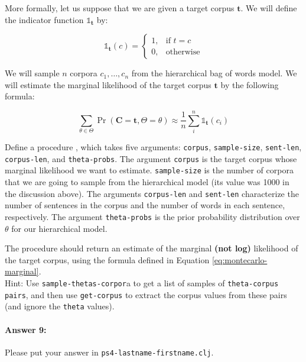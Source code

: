 \documentclass[10pt]{article}
\newcommand{\required}[1]{{\color{blue}{#1}}}
\newcommand{\PSnum}{4}
\begin{document}
More formally, let us suppose that we are given a target
corpus $\mathbf{t}$. We will define the indicator function
$\mathds{1}_{\mathbf{t}}$ by:

\begin{equation}
\mathds{1}_{\mathbf{t}}(c) =
\begin{cases}
    1, & \text{if } t = c\\
    0, & \text{otherwise}
\end{cases}
\end{equation}

 We will sample $n$ corpora $c_1,\ldots,c_n$ from the
hierarchical bag of words model. We will estimate the marginal
likelihood of the target corpus $\mathbf{t}$ by the following formula:

\begin{equation}
\label{eq:montecarlo-marginal}
\sum_{\theta \in \Theta} \Pr(\mathbf{C}=\mathbf{t}, \Theta=\theta)  \approx \frac{1}{n} \sum_{i}^{n}\mathds{1}_{\mathbf{t}}(c_i) 
\end{equation}

 Define a procedure
\required{\texttt{estimate-corpus-marginal}}, which takes five
arguments: \texttt{corpus}, \texttt{sample-size}, \texttt{sent-len},
\texttt{corpus-len}, and \texttt{theta-probs}. The argument
\texttt{corpus} is the target corpus whose marginal likelihood we want
to estimate. \texttt{sample-size} is the number of corpora that we are
going to sample from the hierarchical model (its value was 1000 in the
discussion above). The arguments \texttt{corpus-len} and
\texttt{sent-len} characterize the number of sentences in the corpus
and the number of words in each sentence, respectively. The argument
\texttt{theta-probs} is the prior probability distribution over
$\theta$ for our hierarchical model.

The procedure should return an estimate of the marginal
\textbf{(not log)} likelihood of the target corpus, using the formula
defined in Equation \ref{eq:montecarlo-marginal}.  \\

 Hint: Use \texttt{sample-thetas-corpor}a to get a list of
samples of \texttt{theta-corpus pairs}, and then use
\texttt{get-corpus} to extract the corpus values from these pairs (and
ignore the \texttt{theta} values).

\paragraph{Answer 9:} Please put your answer in
\texttt{ps\PSnum-lastname-firstname.clj}.
\end{document}
